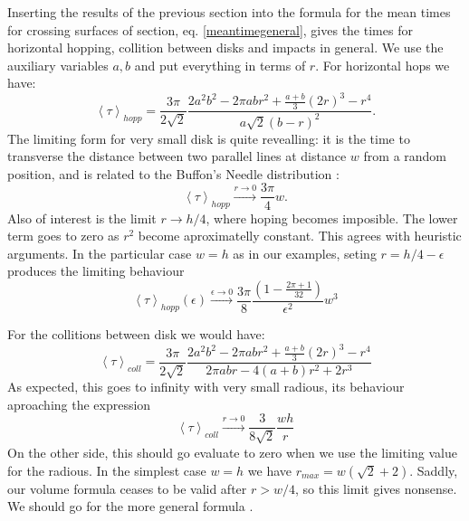 \documentclass[a4paper,10pt, jcp, aps, preprint]{revtex4-1}
\newcommand{\mean}[1]{\left \langle #1 \right \rangle}
\begin{document}
Inserting the results of the previous section 
into the formula for the mean times for crossing
surfaces of section, eq. \ref{meantimegeneral}, gives the times for 
horizontal hopping, 
collition between disks and impacts in general. We use the auxiliary
variables $a,b$ and put everything in terms of $r$. For horizontal
hops we have:
\begin{equation}\label{hoptau}
 \mean{\tau}_{hopp} = 	
\frac{3 \pi}{2\sqrt{2}}
\frac{2 a^{2} b^{2}  - 2 \pi a b r^{2} + \textstyle \frac{a+b}{3}  (2r)^{3}  -  r^4}
{ a \sqrt{2}  ( b - r )^2}.
\end{equation}
The limiting form for very small disk is quite revealling: it is the time
to transverse the distance between two parallel lines at distance $w$ from
a random position, and is related to the Buffon's Needle distribution 
\cite{EScheinerman}:
\begin{equation}\label{hoptaulimit}
 \mean{\tau}_{hopp} \xrightarrow{r\rightarrow 0} 	
\frac{3 \pi}{4}w.
\end{equation}
Also of interest is the limit $r\rightarrow h/4$, where hoping becomes
imposible. The lower term goes to zero as $r^2$ become aproximatelly constant.
This agrees with heuristic arguments. 
In the particular case $w=h$ as in our examples,
seting $r=h/4-\epsilon$ produces the limiting behaviour 
\begin{equation}
 \mean{\tau}_{hopp}(\epsilon) \xrightarrow{\epsilon\rightarrow 0} 	
\frac{3 \pi}{8}
\frac{(1-\frac{2\pi+1}{32})}
{ \epsilon^2} w^3
\end{equation} 


For the collitions between disk we would have:
\begin{equation}\label{colltau}
 \mean{\tau}_{coll} = 	
\frac{3 \pi}{2\sqrt{2}}
\frac {2 a^{2} b^{2}  - 2 \pi a b r^{2} + \textstyle \frac{a+b}{3}  (2r)^{3}  -  r^4}
{2\pi a b r -4(a+b)r^2+2r^3}
\end{equation}
As expected, this goes to infinity with very small radious, its behaviour
aproaching the expression
\begin{equation}\label{colltaulim0}
\mean{\tau}_{coll}  \xrightarrow{r\rightarrow 0} 
\frac{3}{8\sqrt{2}}\frac{wh}{r}
\end{equation}
On the other side, this should go evaluate to zero when
we use the limiting value for the radious. In the simplest
case  $w = h$ we have $r_{max}= w(\sqrt{2}+2)$. Saddly, our volume
formula ceases to be valid after $r>w/4$, so this limit gives nonsense.
We should go for the more general formula \cite{notascalculokarel}.
\end{document}
